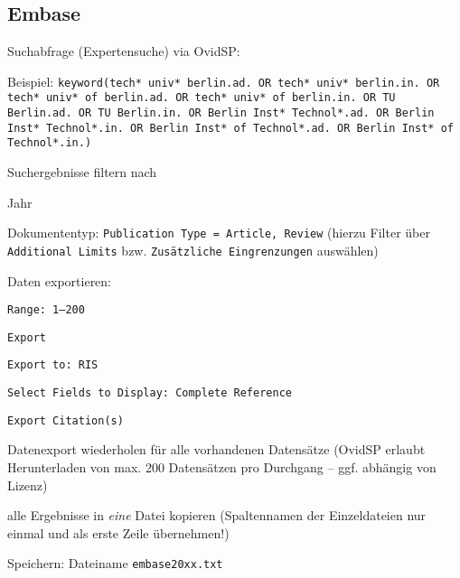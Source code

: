 \subsection*{Embase}
\begin{compactitem}
\item Suchabfrage (Expertensuche) via OvidSP: 
	\begin{compactitem}
	\item Beispiel: \texttt{keyword(tech* univ* berlin.ad. OR tech* univ* berlin.in. OR tech* univ* of berlin.ad. OR tech* univ* of berlin.in. OR \newline TU Berlin.ad. OR TU Berlin.in. OR Berlin Inst* Technol*.ad. OR  \newline Berlin Inst* Technol*.in. OR Berlin Inst* of Technol*.ad. OR  \newline Berlin Inst* of Technol*.in.)}
	\end{compactitem}
\item Suchergebnisse filtern nach
	\begin{compactitem}
    \item Jahr
    \item Dokumententyp: \texttt{Publication Type = Article, Review} (hierzu Filter über \newline \texttt{Additional Limits} bzw. \texttt{Zusätzliche Eingrenzungen} auswählen)
    \end{compactitem}
\item Daten exportieren: 
	\begin{compactitem}
	\item \texttt{Range: 1--200}
    \item \texttt{Export}
    \item \texttt{Export to: RIS}
    \item \texttt{Select Fields to Display: Complete Reference}
    \item \texttt{Export Citation(s)} 
	\end{compactitem}
\item Datenexport wiederholen für alle vorhandenen Datensätze (OvidSP erlaubt Herunterladen von max. 200 Datensätzen pro Durchgang -- ggf. abhängig von Lizenz)
\item alle Ergebnisse in \textit{eine} Datei kopieren (Spaltennamen der Einzeldateien nur einmal und als erste Zeile übernehmen!)
\item Speichern: Dateiname \texttt{embase20xx.txt}
\end{compactitem}

